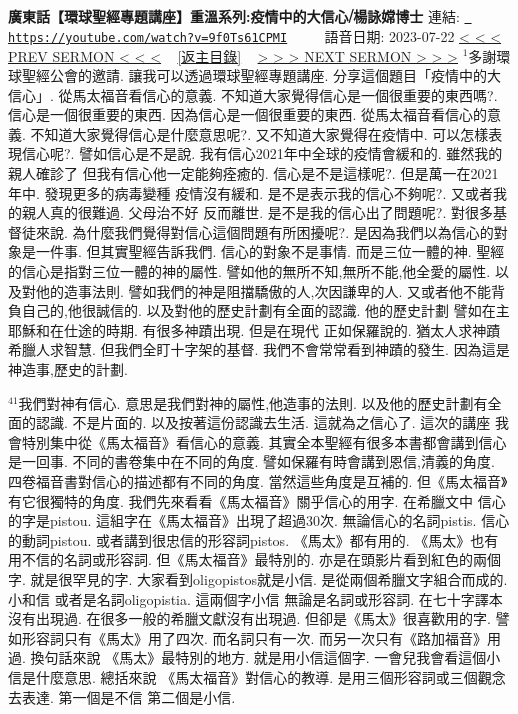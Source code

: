 \documentclass{book}
\begin{document}
\section{}
\label{sec:9f0Ts61CPMI}
\textbf{廣東話【環球聖經專題講座】重溫系列:疫情中的大信心⧸楊詠嫦博士}
\newline
\newline
連結: \href{https://youtube.com/watch?v=9f0Ts61CPMI}{\texttt{ https://youtube.com/watch?v=9f0Ts61CPMI}} ~~~~ 語音日期: 2023-07-22 
\newline
\newline
\hyperref[sec:o_naHdmPOsI]{\small{< < < PREV SERMON < < <}}
~
\hyperref[sec:index]{\small{[返主目錄]}}
~
\hyperref[sec:z2aRisPP3Ug]{\small{> > > NEXT SERMON > > >}}
\newline
\newline
$^{1}$多謝環球聖經公會的邀請.
讓我可以透過環球聖經專題講座.
分享這個題目「疫情中的大信心」.
從馬太福音看信心的意義.
不知道大家覺得信心是一個很重要的東西嗎?.
信心是一個很重要的東西.
因為信心是一個很重要的東西.
從馬太福音看信心的意義.
不知道大家覺得信心是什麼意思呢?.
又不知道大家覺得在疫情中.
可以怎樣表現信心呢?.
譬如信心是不是說.
我有信心2021年中全球的疫情會緩和的.
雖然我的親人確診了 但我有信心他一定能夠痊癒的.
信心是不是這樣呢?.
但是萬一在2021年中.
發現更多的病毒變種 疫情沒有緩和.
是不是表示我的信心不夠呢?.
又或者我的親人真的很難過.
父母治不好 反而離世.
是不是我的信心出了問題呢?.
對很多基督徒來說.
為什麼我們覺得對信心這個問題有所困擾呢?.
是因為我們以為信心的對象是一件事.
但其實聖經告訴我們.
信心的對象不是事情.
而是三位一體的神.
聖經的信心是指對三位一體的神的屬性.
譬如他的無所不知,無所不能,他全愛的屬性.
以及對他的造事法則.
譬如我們的神是阻擋驕傲的人,次因謙卑的人.
又或者他不能背負自己的,他很誠信的.
以及對他的歷史計劃有全面的認識.
他的歷史計劃 譬如在主耶穌和在仕途的時期.
有很多神蹟出現.
但是在現代 正如保羅說的.
猶太人求神蹟 希臘人求智慧.
但我們全盯十字架的基督.
我們不會常常看到神蹟的發生.
因為這是神造事,歷史的計劃.

$^{41}$我們對神有信心.
意思是我們對神的屬性,他造事的法則.
以及他的歷史計劃有全面的認識.
不是片面的.
以及按著這份認識去生活.
這就為之信心了.
這次的講座 我會特別集中從《馬太福音》看信心的意義.
其實全本聖經有很多本書都會講到信心是一回事.
不同的書卷集中在不同的角度.
譬如保羅有時會講到恩信,清義的角度.
四卷福音書對信心的描述都有不同的角度.
當然這些角度是互補的.
但《馬太福音》有它很獨特的角度.
我們先來看看《馬太福音》關乎信心的用字.
在希臘文中 信心的字是pistou.
這組字在《馬太福音》出現了超過30次.
無論信心的名詞pistis.
信心的動詞pistou.
或者講到很忠信的形容詞pistos.
《馬太》都有用的.
《馬太》也有用不信的名詞或形容詞.
但《馬太福音》最特別的.
亦是在頭影片看到紅色的兩個字.
就是很罕見的字.
大家看到oligopistos就是小信.
是從兩個希臘文字組合而成的.
小和信 或者是名詞oligopistia.
這兩個字小信 無論是名詞或形容詞.
在七十字譯本沒有出現過.
在很多一般的希臘文獻沒有出現過.
但卻是《馬太》很喜歡用的字.
譬如形容詞只有《馬太》用了四次.
而名詞只有一次.
而另一次只有《路加福音》用過.
換句話來說 《馬太》最特別的地方.
就是用小信這個字.
一會兒我會看這個小信是什麼意思.
總括來說 《馬太福音》對信心的教導.
是用三個形容詞或三個觀念去表達.
第一個是不信 第二個是小信.
\end{document}
